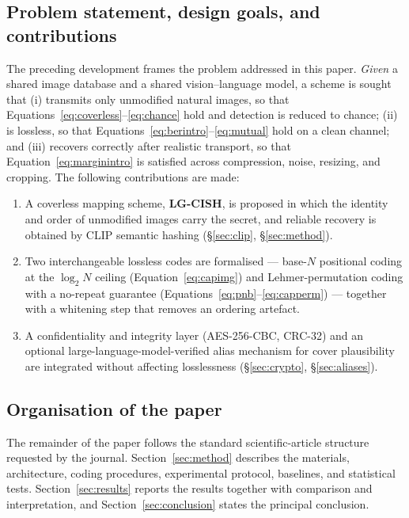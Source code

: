 \documentclass[10pt,a4paper]{article}
\theoremstyle{definition}
\begin{document}
\subsection{Problem statement, design goals, and contributions}\label{sec:contrib}
The preceding development frames the problem addressed in this paper. \emph{Given}
a shared image database and a shared vision--language model, a scheme is sought
that (i) transmits only unmodified natural images, so that
Equations~\eqref{eq:coverless}--\eqref{eq:chance} hold and detection is reduced to chance;
(ii) is lossless, so that Equations~\eqref{eq:berintro}--\eqref{eq:mutual} hold on a clean
channel; and (iii) recovers correctly after realistic transport, so that
Equation~\eqref{eq:marginintro} is satisfied across compression, noise, resizing, and
cropping. The following contributions are made:
\begin{enumerate}
  \item A coverless mapping scheme, \textbf{LG-CISH}, is proposed in which the
        identity and order of unmodified images carry the secret, and reliable
        recovery is obtained by CLIP semantic hashing (\S\ref{sec:clip},
        \S\ref{sec:method}).
  \item Two interchangeable lossless codes are formalised --- base-$N$ positional
        coding at the $\log_2 N$ ceiling (Equation~\eqref{eq:capimg}) and Lehmer-permutation
        coding with a no-repeat guarantee (Equations~\eqref{eq:pnb}--\eqref{eq:capperm}) ---
        together with a whitening step that removes an ordering artefact.
  \item A confidentiality and integrity layer (AES-256-CBC, CRC-32) and an optional
        large-language-model-verified alias mechanism for cover plausibility are
        integrated without affecting losslessness (\S\ref{sec:crypto},
        \S\ref{sec:aliases}).
\end{enumerate}

\subsection{Organisation of the paper}\label{sec:org}
The remainder of the paper follows the standard scientific-article structure
requested by the journal. Section~\ref{sec:method} describes the materials,
architecture, coding procedures, experimental protocol, baselines, and statistical
tests. Section~\ref{sec:results} reports the results together with comparison and
interpretation, and Section~\ref{sec:conclusion} states the principal conclusion.
\end{document}

